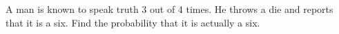 \begin{flushleft}
A man is known to speak truth 3 out of 4 times. He throws a die and reports that it is a
six. Find the probability that it is actually a six.
\end{flushleft}